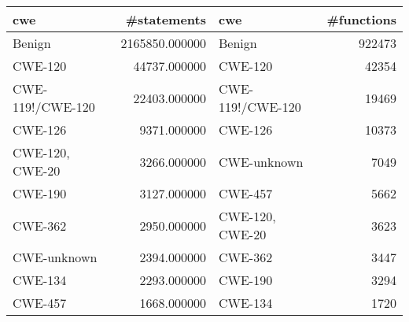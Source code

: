 \begin{tabular}{lrlr}
\toprule
cwe & #statements & cwe & #functions \\
\midrule
Benign & 2165850.000000 & Benign & 922473 \\
CWE-120 & 44737.000000 & CWE-120 & 42354 \\
CWE-119!/CWE-120 & 22403.000000 & CWE-119!/CWE-120 & 19469 \\
CWE-126 & 9371.000000 & CWE-126 & 10373 \\
CWE-120, CWE-20 & 3266.000000 & CWE-unknown & 7049 \\
CWE-190 & 3127.000000 & CWE-457 & 5662 \\
CWE-362 & 2950.000000 & CWE-120, CWE-20 & 3623 \\
CWE-unknown & 2394.000000 & CWE-362 & 3447 \\
CWE-134 & 2293.000000 & CWE-190 & 3294 \\
CWE-457 & 1668.000000 & CWE-134 & 1720 \\
\bottomrule
\end{tabular}
